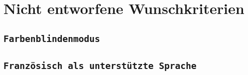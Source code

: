 \section{Nicht entworfene Wunschkriterien}

\subsection{\texttt{Farbenblindenmodus}}

\subsection{\texttt{Französisch als unterstützte Sprache}}


